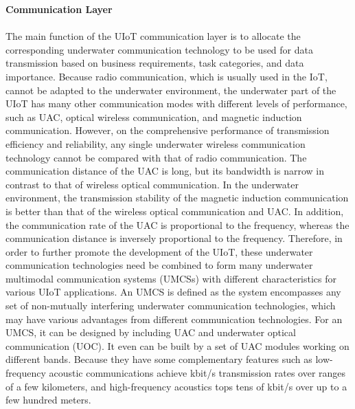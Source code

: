 \documentclass[a4paper,12pt]{article}
\begin{document}
\begin{multicols}{2}
\item\textbf{Communication Layer}\\
\\
The main function of the UIoT communication layer is to allocate the corresponding underwater communication technology to be used for data transmission based on business requirements, task categories, and data importance. Because radio communication, which is usually used in the IoT, cannot be adapted to the underwater environment, the underwater part of the UIoT has many other communication modes with different levels of performance, such as UAC, optical wireless communication, and magnetic induction communication. However, on the comprehensive performance of transmission efficiency and reliability, any single underwater wireless communication technology cannot be compared with that of radio communication. The communication distance of the UAC is long, but its bandwidth is narrow in contrast to that of wireless optical communication. In the underwater environment, the transmission stability of the magnetic induction communication is better than that of the wireless optical communication and UAC. In addition, the communication rate of the UAC is proportional to the frequency, whereas the communication distance is inversely proportional to the frequency. Therefore, in order to further promote the development of the UIoT, these underwater communication technologies need be combined to form many underwater multimodal communication systems (UMCSs) with different characteristics for various UIoT applications. An UMCS is defined as the system encompasses any set of non-mutually interfering underwater communication technologies, which may have various advantages from different communication technologies. For an UMCS, it can be designed by including UAC and underwater optical communication (UOC). It even can be built by a set of UAC modules working on different bands. Because they have some complementary features such as low-frequency acoustic communications achieve kbit/s transmission rates over ranges of a few kilometers, and high-frequency acoustics tops tens of kbit/s over up to a few hundred meters.
\\


\end{multicols}
\end{document}
